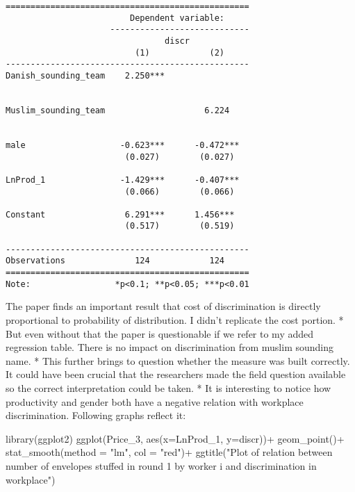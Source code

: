 \documentclass[
]{article}
\newenvironment{Shaded}{\begin{snugshade}}{\end{snugshade}}
\newcommand{\AttributeTok}[1]{\textcolor[rgb]{0.77,0.63,0.00}{#1}}
\newcommand{\FunctionTok}[1]{\textcolor[rgb]{0.00,0.00,0.00}{#1}}
\newcommand{\NormalTok}[1]{#1}
\newcommand{\SpecialCharTok}[1]{\textcolor[rgb]{0.00,0.00,0.00}{#1}}
\newcommand{\StringTok}[1]{\textcolor[rgb]{0.31,0.60,0.02}{#1}}
\begin{document}
\begin{verbatim}
=================================================
                         Dependent variable:     
                     ----------------------------
                                discr            
                          (1)            (2)     
-------------------------------------------------
Danish_sounding_team    2.250***                 
                                                 
                                                 
Muslim_sounding_team                    6.224    
                                                 
                                                 
male                   -0.623***      -0.472***  
                        (0.027)        (0.027)   
                                                 
LnProd_1               -1.429***      -0.407***  
                        (0.066)        (0.066)   
                                                 
Constant                6.291***      1.456***   
                        (0.517)        (0.519)   
                                                 
-------------------------------------------------
Observations              124            124     
=================================================
Note:                 *p<0.1; **p<0.05; ***p<0.01
\end{verbatim}

The paper finds an important result that cost of discrimination is
directly proportional to probability of distribution. I didn't replicate
the cost portion. * But even without that the paper is questionable if
we refer to my added regression table. There is no impact on
discrimination from muslim sounding name. * This further brings to
question whether the measure was built correctly. It could have been
crucial that the researchers made the field question available so the
correct interpretation could be taken. * It is interesting to notice how
productivity and gender both have a negative relation with workplace
discrimination. Following graphs reflect it:

\begin{Shaded}
\begin{Highlighting}[]
\FunctionTok{library}\NormalTok{(ggplot2)}
\FunctionTok{ggplot}\NormalTok{(Price\_3, }\FunctionTok{aes}\NormalTok{(}\AttributeTok{x=}\NormalTok{LnProd\_1, }\AttributeTok{y=}\NormalTok{discr))}\SpecialCharTok{+}
  \FunctionTok{geom\_point}\NormalTok{()}\SpecialCharTok{+}
  \FunctionTok{stat\_smooth}\NormalTok{(}\AttributeTok{method =} \StringTok{"lm"}\NormalTok{, }\AttributeTok{col =} \StringTok{"red"}\NormalTok{)}\SpecialCharTok{+}
   \FunctionTok{ggtitle}\NormalTok{(}\StringTok{"Plot of relation between number of envelopes stuffed in round 1 by worker i and discrimination in workplace"}\NormalTok{)}
\end{Highlighting}
\end{Shaded}
\end{document}

